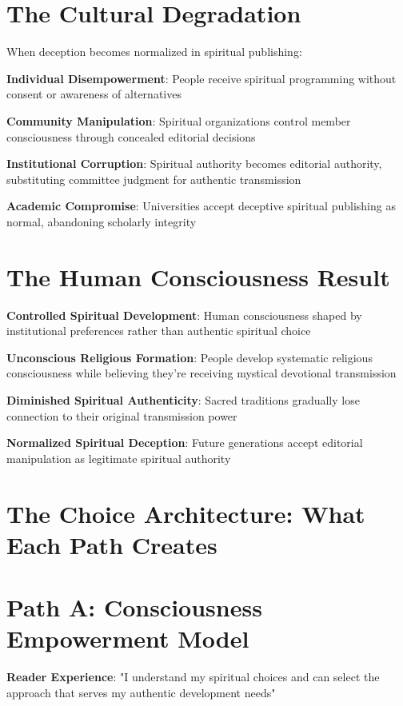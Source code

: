 \documentclass[11pt,twoside]{book}
\begin{document}
\section*{The Cultural Degradation}
\label{sec:org8f8370d}
When deception becomes normalized in spiritual publishing:

\textbf{\textbf{Individual Disempowerment}}: People receive spiritual programming without consent or awareness of alternatives

\textbf{\textbf{Community Manipulation}}: Spiritual organizations control member consciousness through concealed editorial decisions

\textbf{\textbf{Institutional Corruption}}: Spiritual authority becomes editorial authority, substituting committee judgment for authentic transmission

\textbf{\textbf{Academic Compromise}}: Universities accept deceptive spiritual publishing as normal, abandoning scholarly integrity
\section*{The Human Consciousness Result}
\label{sec:org8a35218}
\textbf{\textbf{Controlled Spiritual Development}}: Human consciousness shaped by institutional preferences rather than authentic spiritual choice

\textbf{\textbf{Unconscious Religious Formation}}: People develop systematic religious consciousness while believing they're receiving mystical devotional transmission

\textbf{\textbf{Diminished Spiritual Authenticity}}: Sacred traditions gradually lose connection to their original transmission power

\textbf{\textbf{Normalized Spiritual Deception}}: Future generations accept editorial manipulation as legitimate spiritual authority
\section*{The Choice Architecture: What Each Path Creates}
\label{sec:org7e4bc71}

\section*{Path A: Consciousness Empowerment Model}
\label{sec:org23180c6}
\textbf{\textbf{Reader Experience}}: "I understand my spiritual choices and can select the approach that serves my authentic development needs"
\end{document}
